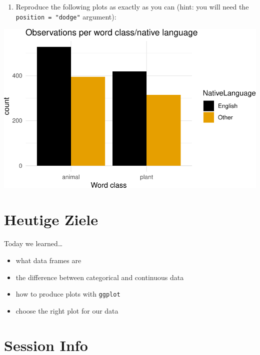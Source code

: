 \documentclass[
  letterpaper,
  DIV=11]{scrartcl}
\providecommand{\tightlist}{%
  \setlength{\itemsep}{0pt}\setlength{\parskip}{0pt}}\usepackage{longtable,booktabs,array}
\theoremstyle{definition}
\theoremstyle{remark}
\begin{document}
\hypertarget{section-2}{%
\subsection{}\label{section-2}}

\begin{enumerate}
\def\labelenumi{\arabic{enumi}.}
\setcounter{enumi}{3}
\tightlist
\item
  Reproduce the following plots as exactly as you can (hint: you will
  need the \texttt{position\ =\ "dodge"} argument):
\end{enumerate}

\includegraphics{_intro_r_slides_files/figure-pdf/unnamed-chunk-29-1.pdf}

\hypertarget{heutige-ziele-1}{%
\section*{Heutige Ziele}\label{heutige-ziele-1}}

Today we learned\ldots{}

\begin{itemize}
\tightlist
\item
  what data frames are
\item
  the difference between categorical and continuous data
\item
  how to produce plots with \texttt{ggplot}
\item
  choose the right plot for our data
\end{itemize}

\hypertarget{session-info}{%
\section*{Session Info}\label{session-info}}
\end{document}
